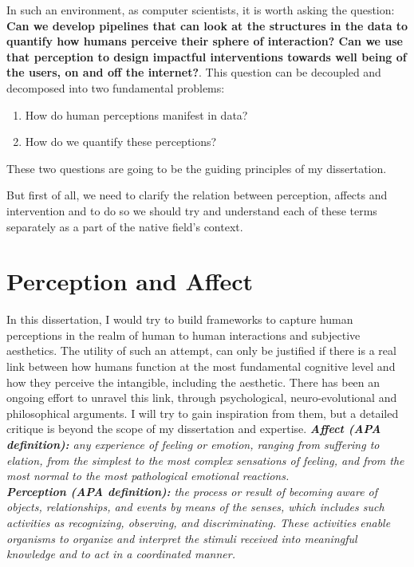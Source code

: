 In such an environment, as computer scientists, it is worth asking the question: \textbf{Can we develop pipelines that can look at the structures in the data to quantify how humans perceive their sphere of interaction? Can we use that perception to design impactful interventions towards well being of the users, on and off the internet?}. 
This question can be decoupled and decomposed into two fundamental problems:
\begin{enumerate}
\item How do human perceptions manifest in data? 
\item How do we quantify these perceptions?
\end{enumerate}
These two questions are going to be the guiding principles of my dissertation. 

But first of all, we need to clarify the relation between perception, affects and intervention and to do so we should try and understand each of these terms separately as a part of the native field's context.

\section{Perception and Affect}
In this dissertation, I would try to build frameworks to capture human perceptions in the realm of human to human interactions and subjective aesthetics. The utility of such an attempt, can only be justified if there is a real link between how humans function at the most fundamental cognitive level and how they perceive the intangible, including the aesthetic. There has been an ongoing effort to unravel this link, through psychological, neuro-evolutional and philosophical arguments. I will try to gain inspiration from them, but a detailed critique is beyond the scope of my dissertation and expertise.
\textsl{\textbf{Affect (APA definition):} any experience of feeling or emotion, ranging from suffering to elation, from the simplest to the most complex sensations of feeling, and from the most normal to the most pathological emotional reactions.}\\
\textsl{\textbf{Perception (APA definition):} the process or result of becoming aware of objects, relationships, and events by means of the senses, which includes such activities as recognizing, observing, and discriminating. These activities enable organisms to organize and interpret the stimuli received into meaningful knowledge and to act in a coordinated manner.}\\

